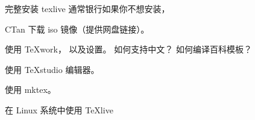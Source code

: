 
\begin{issues}
\issueTODO
\end{issues}

完整安装 texlive 通常银行如果你不想安装，

CTan 下载 iso 镜像（提供网盘链接）。

使用 TeXwork， 以及设置。 如何支持中文？ 如何编译百科模板？

使用 TeXstudio 编辑器。

使用 mktex。

在 Linux 系统中使用 TeXlive
